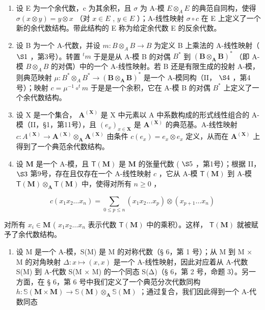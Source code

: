 \begin{enumerate}
\def\labelenumi{(\arabic{enumi})}
\setcounter{enumi}{1}
\item
  设 E 为一个余代数，c 为其余积，且 \(\sigma\) 为 A-模 \(E \otimes_{A} E\) 的典范自同构，使得 \(\sigma(x \otimes y) = y \otimes x\) （对 \(x \in E\) , \(y \in E\) ）；A-线性映射 \(\sigma \circ c\) 在 E 上定义了一个新的余代数结构。带此结构的 E 称为给定余代数 E 的反余代数。
\item
  设 B 为一个 A-代数，并设 \(m:B \otimes_{A} B \to B\) 为定义 B 上乘法的 A-线性映射（ \(\S 1\) ，第3号）。转置 \(^{t}m\) 于是是从 A-模 B 的对偶 \(B^{*}\) 到 \((\mathbf{B} \otimes_{\mathbf{A}} \mathbf{B})^{*}\) （即 A-模 \(B \otimes_{A} B\) 的对偶）中的一个 A-线性映射。若 B 还是有限生成的投射 A-模，则典范映射 \(\mu:B^{*} \otimes_{A} B^{*} \to (\mathbf{B} \otimes_{\mathbf{A}} \mathbf{B})^{*}\) 是一个 A-模同构（II， \(\S 4\) ，第4号）；映射 \(c = \mu^{-1} \circ ^{t}m\) 于是是一个余积，它在 A-模 B 的对偶 \(B^{*}\) 上定义了一个余代数结构。
\item
  设 X 是一个集合， \(\mathbf{A}^{(\mathbf{X})}\) 是 X 中元素以 A 中系数构成的形式线性组合的 A-模（II，§1，第11号），且 \((e_{x})_{x\in\mathbf{X}}\) 是 \(\mathbf{A}^{(\mathbf{X})}\) 的典范基。A-线性映射 \(c:A^{(\mathbf{X})}\to\mathbf{A}^{(\mathbf{X})}\otimes_{\mathbf{A}}\mathbf{A}^{(\mathbf{X})}\) 由条件 \(c(e_{x})=e_{x}\otimes e_{x}\) 定义，从而在 \(\mathbf{A}^{(\mathbf{X})}\) 上得到了一个典范余代数结构。
\item
  设 \(\mathbf{M}\) 是一个 A-模，且 \(\mathsf{T}(\mathbf{M})\) 是 \(\mathbf{M}\) 的张量代数 ( \(\S 5\) ，第1号）；根据 II， \(\S 3\) 第9号，存在且仅存在一个 A-线性映射 \(c\) ，它从 A-模 \(\mathsf{T}(\mathbf{M})\) 到 A-模 \(\mathsf{T}(\mathbf{M}) \otimes_{\mathbf{A}} \mathsf{T}(\mathbf{M})\) 中，使得对所有 \(n \geqslant 0\) ，
\end{enumerate}

\[
c (x _ {1} x _ {2} \dots x _ {n}) = \sum_ {0 \leqslant p \leqslant n} (x _ {1} x _ {2} \dots x _ {p}) \otimes (x _ {p + 1} \dots x _ {n})\tag{3}
\]

对所有 \(x_{i} \in \mathbf{M}\) ( \(x_{1}x_{2}\ldots x_{n}\) 表示代数 \(\mathsf{T}(\mathbf{M})\) 中的乘积）。这样， \(\mathsf{T}(\mathbf{M})\) 就被赋予了余代数结构。

\begin{enumerate}
\def\labelenumi{(\arabic{enumi})}
\setcounter{enumi}{5}
\tightlist
\item
  设 M 是一个 A-模，S(M) 是 M 的对称代数（§ 6，第 1 号）；从 M 到 M × M 的对角映射 \(\Delta: x \mapsto (x, x)\) 是一个 A-线性映射，因此对应着从 A-代数 S(M) 到 A-代数 S(M × M) 的一个同态 S(Δ)（§ 6，第 2 号，命题 3）。另一方面，在 § 6，第 6 号中我们定义了一个典范分次代数同构 \(h \colon \mathbb{S}(\mathbf{M} \times \mathbf{M}) \to \mathbb{S}(\mathbf{M}) \otimes_{\mathbf{A}} \mathbb{S}(\mathbf{M})\) ；通过复合，我们因此得到一个 A-代数同态
\end{enumerate}

